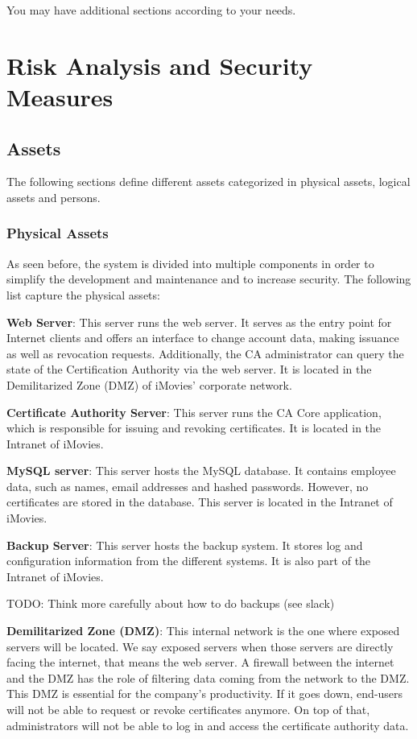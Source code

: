 \documentclass[english]{article}
\begin{document}
You may have additional sections according to your needs.


\section{Risk Analysis and Security Measures}

\subsection{Assets}
\label{assets}

The following sections define different assets categorized in physical assets, logical assets and persons.

\subsubsection{Physical Assets}
As seen before, the system is divided into multiple components in order to simplify the development and maintenance and to increase security. The following list capture the physical assets:

\textbf{Web Server}: This server runs the web server. It serves as the entry point for Internet clients and offers an interface to change account data, making issuance as well as revocation requests. Additionally, the CA administrator can query the state of the Certification Authority via the web server. It is located in the Demilitarized Zone (DMZ) of iMovies' corporate network.

\textbf{Certificate Authority Server}: This server runs the CA Core application, which is responsible for issuing and revoking certificates. It is located in the Intranet of iMovies.

\textbf{MySQL server}: This server hosts the MySQL database. It contains employee data, such as names, email addresses and hashed passwords. However, no certificates are stored in the database. This server is located in the Intranet of iMovies.

\textbf{Backup Server}: This server hosts the backup system. It stores log and configuration information from the different systems. It is also part of the Intranet of iMovies.

TODO: Think more carefully about how to do backups (see slack)

\textbf{Demilitarized Zone (DMZ)}: This internal network is the one where exposed servers will be located. We say exposed servers when those servers are directly facing the internet, that means the web server. A firewall between the internet and the DMZ has the role of filtering data coming from the network to the DMZ. This DMZ is essential for the company's productivity. If it goes down, end-users will not be able to request or revoke certificates anymore. On top of that, administrators will not be able to log in and access the certificate authority data.
\end{document}
